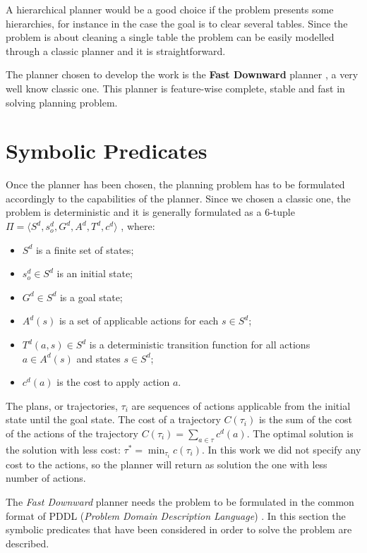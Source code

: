 A hierarchical planner would be a good choice if the problem presents some hierarchies, for instance in the case the goal is to clear several tables. Since the problem is about cleaning a single table the problem can be easily modelled through a classic planner and it is straightforward.

The planner chosen to develop the work is the \textbf{Fast Downward} planner \citep{helmert2006fast}, a very well know classic one. 
This planner is feature-wise complete, stable and fast in solving planning problem.

\section{Symbolic Predicates}
Once the planner has been chosen, the planning problem has to be formulated accordingly to the capabilities of the planner. Since we chosen a classic one, the problem is deterministic and it is generally formulated as a $6$-tuple $\Pi=\langle S^d, s_o^d, G^d, A^d, T^d, c^d \rangle$ \cite{little2007probabilistic}, where:
\begin{itemize}
\item $S^d$ is a finite set of states;
\item $s_o^d \in S^d$ is an initial state;
\item $G^d \in S^d$ is a goal state;
\item $A^d(s)$ is a set of applicable actions for each $s \in S^d$;
\item $T^d(a,s) \in S^d$ is a deterministic transition function for all actions $a \in A^d(s)$ and states $ s \in S^d$;
\item $c^d(a)$ is the cost to apply action $a$. 
\end{itemize}
The plans, or trajectories, $\tau_i$ are sequences of actions applicable from the initial state until the goal state. The cost of a trajectory $C(\tau_i)$ is the sum of the cost of the actions of the trajectory $C(\tau_i) = \sum_{a \in \tau} c^d(a)$. The optimal solution is the solution with less cost: $\tau^* = \min_{\tau_i} c(\tau_i)$.
In this work we did not specify any cost to the actions, so the planner will return as solution the one with less number of actions.

The \textit{Fast Downward} planner needs the problem to be formulated in the common format of PDDL (\textit{Problem Domain Description Language}) \citep{pddl}. In this section the symbolic predicates that have been considered in order to solve the problem are described.

